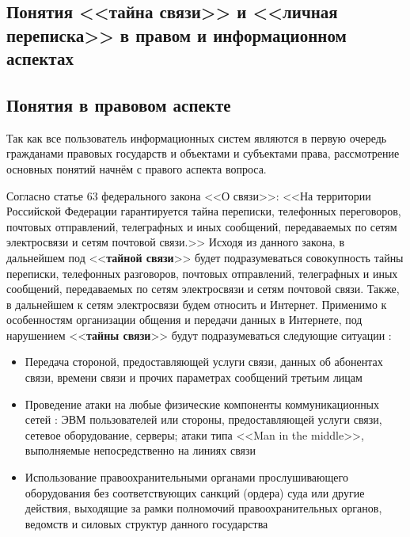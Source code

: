 \parindent=1cm %
\begin{center}
		
		\section{Понятия <<тайна связи>> и <<личная переписка>> в правом и информационном аспектах}
		
\end{center}

\subsection{Понятия в правовом аспекте} 

Так как все пользователь информационных систем являются в первую очередь гражданами правовых государств и объектами и субъектами права, рассмотрение основных понятий начнём с правого аспекта вопроса.

Согласно статье 63 федерального закона <<О связи>>: %
<<На территории Российской Федерации гарантируется тайна переписки, телефонных переговоров, почтовых отправлений, телеграфных и иных сообщений, передаваемых по сетям электросвязи и сетям почтовой связи.>> Исходя из данного закона, в дальнейшем под <<\textbf{тайной связи}>>  будет подразумеваться совокупность тайны переписки, телефонных разговоров, почтовых отправлений, телеграфных и иных сообщений, передаваемых по сетям электросвязи и сетям почтовой связи. Также, в дальнейшем к сетям электросвязи будем относить и Интернет. Применимо к особенностям организации общения и передачи данных в Интернете, под нарушением <<\textbf{тайны связи}>> будут подразумеваться следующие ситуации : 
\begin{itemize}
	\item Передача стороной, предоставляющей услуги связи, данных об абонентах связи, времени связи и прочих параметрах сообщений третьим лицам
	\item  Проведение атаки на любые  физические компоненты коммуникационных сетей  : ЭВМ пользователей или стороны, предоставляющей услуги связи, сетевое оборудование, серверы; атаки типа <<Man in the middle>>, выполняемые непосредственно на линиях связи
	\item Использование правоохранительными органами прослушивающего оборудования без соответствующих санкций (ордера) суда или другие действия, выходящие за рамки полномочий правоохранительных органов, ведомств и силовых структур данного государства 
\end{itemize} 
 
\newpage %